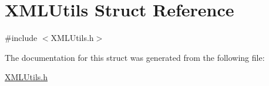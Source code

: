 \hypertarget{structXMLUtils}{}\section{X\+M\+L\+Utils Struct Reference}
\label{structXMLUtils}


{\ttfamily \#include $<$X\+M\+L\+Utils.\+h$>$}



The documentation for this struct was generated from the following file\+:\begin{DoxyCompactItemize}
\item 
\hyperlink{XMLUtils_8h}{X\+M\+L\+Utils.\+h}\end{DoxyCompactItemize}
